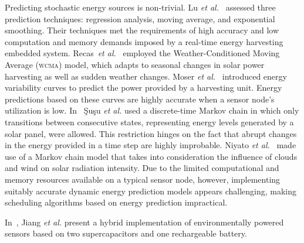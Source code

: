 Predicting stochastic energy sources is non-trivial.
Lu \emph{et al.}~\cite{lu2010accurate} assessed three prediction techniques: regression analysis,
moving average, and exponential smoothing.  Their techniques met the requirements of high accuracy and low computation and memory demands imposed by a real-time energy
harvesting embedded system.
Recas~\emph{et al.}~\cite{recas2000hollows} employed the Weather-Conditioned Moving Average (\textsc{wcma}) model,
which adapts to seasonal changes in solar power harvesting as well as sudden weather changes.
Moser \emph{et al.}~\cite{moser2007real} introduced energy variability curves to predict the power provided by a
harvesting unit. Energy predictions based on these curves are highly accurate when a sensor node's utilization is low.
In~\cite{susu2008stochastic} \c{S}u\c{s}u \emph{et al.} used a discrete-time Markov chain in which only transitions between
consecutive states, representing energy levels generated by a solar panel, were allowed. This restriction hinges
on the fact that abrupt changes in the energy provided in a time step are highly improbable. Niyato \emph{et al.}~\cite{niyato2007sleep} made use of a Markov chain model that takes into
consideration the influence of clouds and wind on solar radiation intensity.
Due to the limited computational and memory resources available on a typical sensor node, however,
implementing suitably accurate dynamic energy prediction models appears challenging, making
scheduling algorithms based on energy prediction impractical.

In~\cite{jiang2005perpetual}, Jiang \emph{et al.} present a hybrid implementation of environmentally powered sensors based on two supercapacitors and one rechargeable battery.